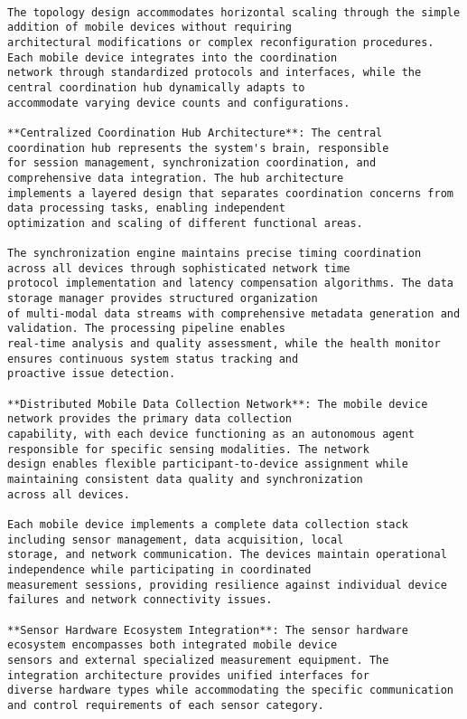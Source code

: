 \documentclass[12pt,a4paper]{report}
\begin{document}
\begin{verbatim}

The topology design accommodates horizontal scaling through the simple addition of mobile devices without requiring
architectural modifications or complex reconfiguration procedures. Each mobile device integrates into the coordination
network through standardized protocols and interfaces, while the central coordination hub dynamically adapts to
accommodate varying device counts and configurations.

**Centralized Coordination Hub Architecture**: The central coordination hub represents the system's brain, responsible
for session management, synchronization coordination, and comprehensive data integration. The hub architecture
implements a layered design that separates coordination concerns from data processing tasks, enabling independent
optimization and scaling of different functional areas.

The synchronization engine maintains precise timing coordination across all devices through sophisticated network time
protocol implementation and latency compensation algorithms. The data storage manager provides structured organization
of multi-modal data streams with comprehensive metadata generation and validation. The processing pipeline enables
real-time analysis and quality assessment, while the health monitor ensures continuous system status tracking and
proactive issue detection.

**Distributed Mobile Data Collection Network**: The mobile device network provides the primary data collection
capability, with each device functioning as an autonomous agent responsible for specific sensing modalities. The network
design enables flexible participant-to-device assignment while maintaining consistent data quality and synchronization
across all devices.

Each mobile device implements a complete data collection stack including sensor management, data acquisition, local
storage, and network communication. The devices maintain operational independence while participating in coordinated
measurement sessions, providing resilience against individual device failures and network connectivity issues.

**Sensor Hardware Ecosystem Integration**: The sensor hardware ecosystem encompasses both integrated mobile device
sensors and external specialized measurement equipment. The integration architecture provides unified interfaces for
diverse hardware types while accommodating the specific communication and control requirements of each sensor category.


\end{verbatim}
\end{document}
